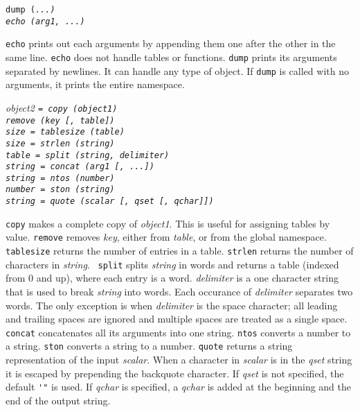 \begin{flushleft}
\tt dump (\it ...\tt )\\
\tt echo (\it arg1, ...\tt )\\
\end{flushleft}\vspace{-2\itemsep}
{\tt echo} prints out each arguments by appending them one after the other in
the same line. {\tt echo} does not handle tables or functions. {\tt dump}
prints its arguments separated by newlines. It can handle any type of {\LEFTY}
object. If {\tt dump} is called with no arguments, it prints the entire
namespace.

\begin{flushleft}
\it object2 \tt = copy (\it object1\tt )\\
\tt remove (\it key [, table]\/\tt )\\
\it size \tt = tablesize (\it table\tt )\\
\it size \tt = strlen (\it string\tt )\\
\it table \tt = split (\it string, delimiter\tt )\\
\it string \tt = concat (\it arg1 [, ...]\/\tt )\\
\it string \tt = ntos (\it number\tt )\\
\it number \tt = ston (\it string\tt )\\
\it string \tt = quote (\it scalar [, qset [, qchar]]\/\tt )\\
\end{flushleft}\vspace{-2\itemsep}
{\tt copy} makes a complete copy of {\it object1}. This is useful for assigning
tables by value. {\tt remove} removes {\it key}, either from {\it table}, or
from the global namespace. {\tt tablesize} returns the number of entries in a
table. {\tt strlen} returns the number of characters in {\it string}.  {\tt
split} splits {\it string} in words and returns a table (indexed from 0 and
up), where each entry is a word. {\it delimiter} is a one character string that
is used to break {\it string} into words. Each occurance of {\it delimiter}
separates two words. The only exception is when {\it delimiter} is the space
character; all leading and trailing spaces are ignored and multiple spaces are
treated as a single space. {\tt concat} concatenates all its arguments into one
string. {\tt ntos} converts a number to a string. {\tt ston} converts a
string to a number. {\tt quote} returns a string representation of the input
{\it scalar}. When a character in {\it scalar} is in the {\it qset} string it
is escaped by prepending the backquote character. If {\it qset} is
not specified, the default \verb+'"+ is used. If {\it qchar} is specified,
a {\it qchar} is added at the beginning and the end of the output string.

